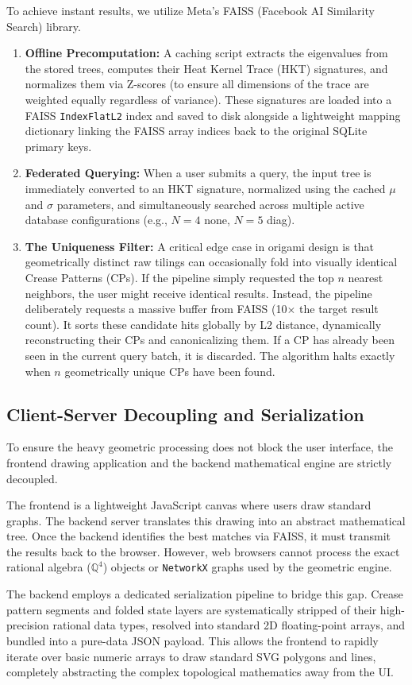 \documentclass[11pt]{article}
\begin{document}
To achieve instant results, we utilize Meta's FAISS (Facebook AI Similarity Search) library.
\begin{enumerate}
    \item \textbf{Offline Precomputation:} A caching script extracts the eigenvalues from the stored trees, computes their Heat Kernel Trace (HKT) signatures, and normalizes them via Z-scores (to ensure all dimensions of the trace are weighted equally regardless of variance). These signatures are loaded into a FAISS \texttt{IndexFlatL2} index and saved to disk alongside a lightweight mapping dictionary linking the FAISS array indices back to the original SQLite primary keys.
    
    \item \textbf{Federated Querying:} When a user submits a query, the input tree is immediately converted to an HKT signature, normalized using the cached $\mu$ and $\sigma$ parameters, and simultaneously searched across multiple active database configurations (e.g., $N=4$ none, $N=5$ diag).
    
    \item \textbf{The Uniqueness Filter:} A critical edge case in origami design is that geometrically distinct raw tilings can occasionally fold into visually identical Crease Patterns (CPs). If the pipeline simply requested the top $n$ nearest neighbors, the user might receive identical results. Instead, the pipeline deliberately requests a massive buffer from FAISS (10$\times$ the target result count). It sorts these candidate hits globally by L2 distance, dynamically reconstructing their CPs and canonicalizing them. If a CP has already been seen in the current query batch, it is discarded. The algorithm halts exactly when $n$ geometrically unique CPs have been found.
\end{enumerate}

\subsection{Client-Server Decoupling and Serialization}
To ensure the heavy geometric processing does not block the user interface, the frontend drawing application and the backend mathematical engine are strictly decoupled. 

The frontend is a lightweight JavaScript canvas where users draw standard graphs. The backend server translates this drawing into an abstract mathematical tree. Once the backend identifies the best matches via FAISS, it must transmit the results back to the browser. However, web browsers cannot process the exact rational algebra ($\mathbb{Q}^4$) objects or \texttt{NetworkX} graphs used by the geometric engine. 

The backend employs a dedicated serialization pipeline to bridge this gap. Crease pattern segments and folded state layers are systematically stripped of their high-precision rational data types, resolved into standard 2D floating-point arrays, and bundled into a pure-data JSON payload. This allows the frontend to rapidly iterate over basic numeric arrays to draw standard SVG polygons and lines, completely abstracting the complex topological mathematics away from the UI.
\end{document}
